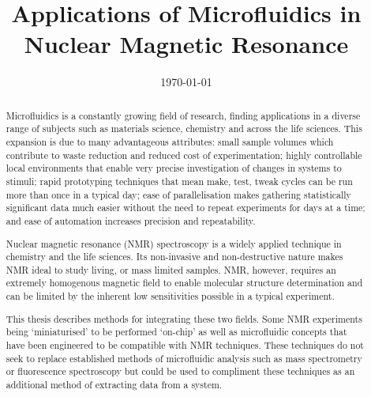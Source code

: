 \documentclass{ecsthesis}      %
\begin{document}
\frontmatter
\title      {Applications of Microfluidics in Nuclear Magnetic Resonance}
\addresses  {\groupname\\\deptname\\\univname}
\date       {\today}
\subject    {}
\keywords   {}
\maketitle
\begin{abstract}
  Microfluidics is a constantly growing field of research, finding applications in a diverse range of subjects
  such as materials science, chemistry and across the life sciences. This expansion is due to many advantageous attributes:
  small sample volumes which contribute to waste reduction and reduced cost of
  experimentation; highly controllable local environments that enable very precise investigation of changes in
  systems to stimuli; rapid prototyping techniques that mean make, test, tweak cycles can be run more than once
  in a typical day; ease of parallelisation makes gathering statistically significant data much easier without
  the need to repeat experiments for days at a time; and ease of automation increases precision and repeatability.

  Nuclear magnetic resonance (NMR) spectroscopy is a widely applied technique in chemistry and the life sciences.
  Its non-invasive and non-destructive nature makes NMR ideal to study living, or mass limited samples. NMR, however,
  requires an extremely homogenous magnetic field to enable molecular structure determination and can be limited
  by the inherent low sensitivities possible in a typical experiment.

  This thesis describes methods for integrating these two fields. Some NMR experiments being ‘miniaturised’ to
  be performed ‘on-chip’ as well as microfluidic concepts that have been engineered to be compatible with NMR
  techniques. These techniques do not seek to replace established methods of microfluidic analysis such as mass
  spectrometry or fluorescence spectroscopy but could be used to compliment these techniques as an additional
  method of extracting data from a system.

\end{abstract}
\tableofcontents
\listoffigures
\listoftables
\lstlistoflistings
\end{document}
